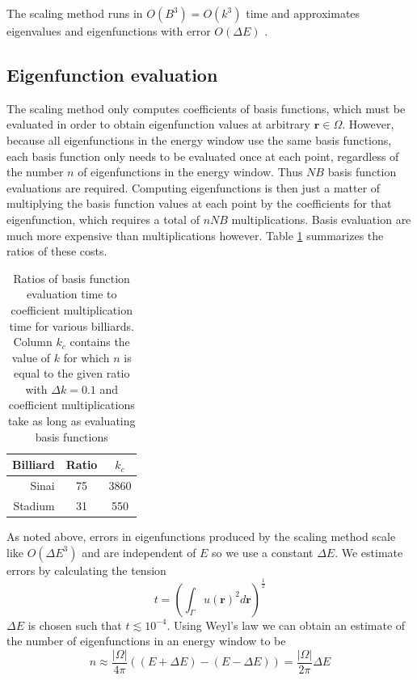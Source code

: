 \documentclass{report}
\newcommand{\rr}[0]{\mathbf{r}}
\begin{document}
The scaling method runs in $O(B^{3}) = O(k^{3})$ time \cite{barnett} and approximates eigenvalues and eigenfunctions with error $O(\Delta E)$ \cite[p. 32]{barnett_hassell}.

\subsection{Eigenfunction evaluation}
The scaling method only computes coefficients of basis functions, which must be evaluated in order to obtain eigenfunction values at arbitrary $\rr \in \Omega$. However, because all eigenfunctions in the energy window use the same basis functions, each basis function only needs to be evaluated once at each point, regardless of the number $n$ of eigenfunctions in the energy window. Thus $NB$ basis function evaluations are required. Computing eigenfunctions is then just a matter of multiplying the basis function values at each point by the coefficients for that eigenfunction, which requires a total of $nNB$ multiplications. Basis evaluation are much more expensive than multiplications however. Table \ref{tab:eval_ratios} summarizes the ratios of these costs.

\begin{table}
  \centering
  \begin{tabular}{|r|c|c|}
    \hline
    Billiard & Ratio & $k_c$ \\ \hline
    \hline
    Sinai & 75 & 3860 \\ \hline
    Stadium & 31 & 550 \\
    \hline
  \end{tabular}
  \caption{Ratios of basis function evaluation time to coefficient multiplication time for various billiards. Column $k_c$ contains the value of $k$ for which $n$ is equal to the given ratio with $\Delta k = 0.1$ and coefficient multiplications take as long as evaluating basis functions}
  \label{tab:eval_ratios}
\end{table}

As noted above, errors in eigenfunctions produced by the scaling method scale like $O({\Delta E}^{3})$ and are independent of $E$ so we use a constant $\Delta E$. We estimate errors by calculating the tension
\[
t = \left( \int_{\Gamma} u(\rr)^{2} d\rr \right)^{\frac{1}{2}}
\]
$\Delta E$ is chosen such that $t \lesssim 10^{-4}$. Using Weyl's law we can obtain an estimate of the number of eigenfunctions in an energy window to be
\[
n \approx \frac{\vert \Omega \vert}{4 \pi} ((E + \Delta E) - (E - \Delta E)) = \frac{\vert \Omega \vert}{2 \pi} \Delta E
\]
\end{document}

